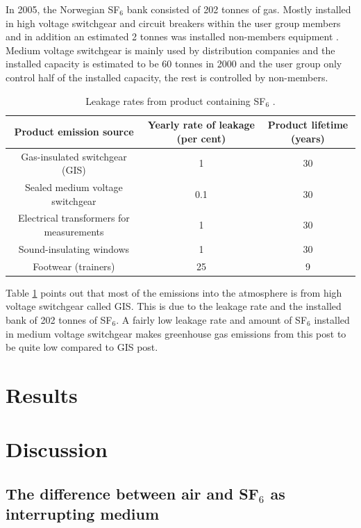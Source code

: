 \documentclass[10pt,a4paper]{article} %
\begin{document}
In 2005, the Norwegian SF$_6$ bank consisted of 202 tonnes of gas. Mostly installed in high voltage switchgear and circuit breakers within the user group members and in addition an estimated 2 tonnes was installed non-members equipment \cite{bib:StatSF6}. Medium voltage switchgear is mainly used by distribution companies and the installed capacity is estimated to be 60 tonnes in 2000 \cite{bib:StatSF6} and the user group only control half of the installed capacity, the rest is controlled by non-members. 

\begin{table}[H]
\center
\caption{Leakage rates from product containing SF$_6$ \cite{bib:StatSF6}.}
\begin{tabular}{|c|c|c|}
\hline 
\textbf{Product emission source}
 & \textbf{Yearly rate of
leakage (per cent)}
 & \textbf{Product lifetime
(years)}
 \\ 
\hline 
Gas-insulated switchgear (GIS)
 & 1 & 30 \\ 
\hline 
Sealed medium voltage switchgear
 & 0.1 & 30 \\ 
\hline 
Electrical transformers for
measurements
 & 1 & 30 \\ 
\hline 
Sound-insulating windows
 & 1 & 30 \\ 
\hline 
Footwear (trainers)
 & 25 & 9 \\ 
\hline 
\end{tabular} 
\label{tab:leakageRatesProdSF6}
\end{table}
\newpage

Table \ref{tab:leakageRatesProdSF6} points out that most of the emissions into the atmosphere is from high voltage switchgear called GIS. This is due to the leakage rate and the installed bank of 202 tonnes of SF$_6$. A fairly low leakage rate and amount of SF$_6$ installed in medium voltage switchgear makes greenhouse gas emissions from this post to be quite low compared to GIS post.



\section{Results}

\newpage

\section{Discussion}
\subsection{The difference between air and SF$_6$ as interrupting medium} \label{sec:airandsf} 
\end{document}
